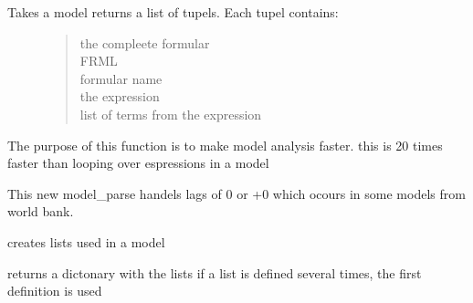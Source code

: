 \documentclass[letterpaper,10pt,english]{sphinxmanual}
\begin{document}

\begin{fulllineitems}
\label{\detokenize{index:modelpattern.model_parse}}
\pysigstartsignatures
{}
\pysigstopsignatures\begin{description}
\item[{Takes a model returns a list of tupels. Each tupel contains:}] \leavevmode\begin{quote}\begin{description}
\item[{the compleete formular}] \leavevmode
\item[{FRML}] \leavevmode
\item[{formular name}] \leavevmode
\item[{the expression}] \leavevmode
\item[{list of terms from the expression}] \leavevmode
\end{description}\end{quote}

\end{description}

\sphinxAtStartPar
The purpose of this function is to make model analysis faster. this is 20 times faster than looping over espressions in a model

\sphinxAtStartPar
This new model\_parse handels lags of \sphinxhyphen{}0 or +0 which ocours in some models from world bank.

\end{fulllineitems}


\begin{fulllineitems}
\label{\detokenize{index:modelpattern.list_extract}}
\pysigstartsignatures
{}
\pysigstopsignatures
\sphinxAtStartPar
creates lists used in a model

\sphinxAtStartPar
returns a dictonary with the lists
if a list is defined several times, the first definition is used

\end{fulllineitems}
\end{document}
